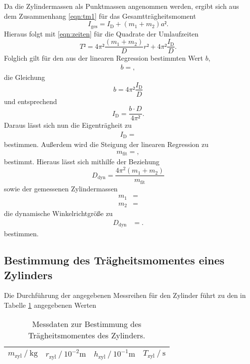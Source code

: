Da die Zylindermassen als Punktmassen angenommen werden, ergibt sich aus dem Zusammenhang \eqref{eqn:tm1} für das Gesamtträgheitsmoment
\begin{equation}
  I_{\text{ges}} = I_{\text{D}} + (m_1+m_2)a².
\end{equation}
Hieraus folgt mit \eqref{eqn:zeiten} für die Quadrate der Umlaufzeiten
\begin{equation}
  T² = 4\pi² \frac{(m_1+m_2)}{D}r² + 4\pi² \frac{I_{\text{D}}}{D}.
\end{equation}
Folglich gilt für den aus der linearen Regression bestimmten Wert $b$,
\begin{align*}
  b = ,
\end{align*}
die Gleichung
\begin{equation}
  b = 4\pi² \frac{I_{\text{D}}}{D}
\end{equation}
und entsprechend
\begin{equation}
  I_{\text{D}} = \frac{b \cdot D}{4\pi²}.
\end{equation}
Daraus lässt sich nun die Eigenträgheit zu
\begin{align*}
  I_{\text{D}} = 
\end{align*}
bestimmen.
Außerdem wird die Steigung der linearen Regression zu
\begin{align*}
  m_{\text{fit}} = ,
\end{align*}
bestimmt.
Hieraus lässt sich mithilfe der Beziehung
\begin{equation}
  D_\text{dyn} = \frac{4 \pi^2 (m_1 + m_2)}{m_\text{fit}}
\end{equation}
sowie der gemessenen Zylindermassen
\begin{align*}
m_1 &= \\
m_2 &= 
\end{align*}
die dynamische Winkelrichtgröße zu
\begin{align*}
  D_\text{dyn}   &=   .
\end{align*}
bestimmen.
\subsection{Bestimmung des Trägheitsmomentes eines Zylinders}
Die Durchführung der angegebenen Messreihen für den Zylinder führt zu den in Tabelle \ref{tab:zyl} angegebenen Werten

\begin{table}[H]
  \centering
  \caption{Messdaten zur Bestimmung des Trägheitsmomentes des Zylinders.}
  \label{tab:zyl}
  \begin{tabular}{c c c c}
    \toprule
    {$m_\text{zyl} \ /\ \si{\kilo\gram}$} & {$r_\text{zyl} \ /\ 10^{-2} \si{\metre}$} & {$h_\text{zyl} \ /\ 10^{-1}\si{\metre}$} & {$T_\text{zyl} \ /\ \si{\second}$}\\
    \midrule
    
    \bottomrule
  \end{tabular}
\end{table}

